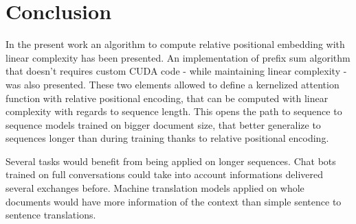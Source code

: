\section{Conclusion}

In the present work an algorithm to compute
\citet{shaw2018selfattention} relative
positional embedding with linear complexity has been presented. An implementation of \citet{choromanski2021rethinking} prefix sum algorithm that doesn't requires custom CUDA code - while maintaining linear complexity - was also presented. These two elements allowed to define a kernelized attention function with relative positional encoding, that can be computed with linear complexity with regards to sequence length. This opens the path to sequence to sequence models trained on bigger document size, that better generalize to sequences longer than during training thanks to relative positional encoding.

Several tasks would benefit from being applied on longer sequences. Chat bots trained on full conversations could take into account informations delivered several exchanges before. Machine translation models applied on whole documents would have more information of the context than simple sentence to sentence translations.

\endinput

